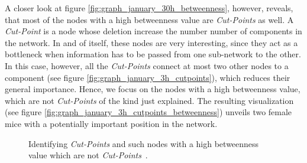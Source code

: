 A closer look at figure \ref{fig:graph_january_30h_betweenness}, however, reveals, that most of the nodes with a high betweenness value are \textit{Cut-Points} as well. A \textit{Cut-Point} is a node whose deletion increase the number number of components in the network\cite{pajek:03}. In and of itself, these nodes are very interesting, since they act as a bottleneck when information has to be passed from one sub-network to the other. In this case, however, all the \textit{Cut-Points} connect at most two other nodes to a component (see figure \ref{fig:graph_january_3h_cutpoints}), which reduces their general importance. Hence, we focus on the nodes with a high betweenness value, which are not \textit{Cut-Points} of the kind just explained. The resulting visualization (see figure \ref{fig:graph_january_3h_cutpoints_betweenness}) unveils two female mice with a potentially important position in the network. 

\begin{figure}[htpb]%
	\centering 
	\qquad
  	
  	\caption[Network visualization of \textit{Cut-Points} and such with a high betweenness value which are not \textit{Cut-Points}]{Identifying \textit{Cut-Points}  and such nodes with a high betweenness value which are not \textit{Cut-Points}~.}
  	
\end{figure}


